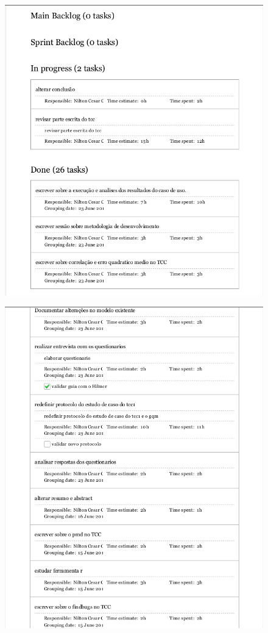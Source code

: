 \begin{apendicesenv}
\begin{figure}[h!]
\centering
\includegraphics[keepaspectratio=false,scale=0.70]{figuras/figuras_nilton/kanban1.png}
\end{figure}

\begin{figure}[h!]
\centering
\includegraphics[keepaspectratio=false,scale=0.70]{figuras/figuras_nilton/kanban2.png}
\end{figure}


\end{apendicesenv}
